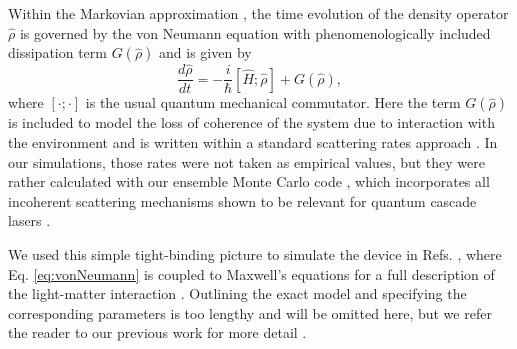 \documentclass[]{spie}  %
\def\h{\hat}
\def\h{\hat}
\begin{document}
Within the Markovian approximation \cite{knezevic2013time}, the time evolution of the density operator $\h{\rho}$ is governed by the von Neumann equation with phenomenologically included dissipation term $G(\h{\rho})$ and is given by
\begin{equation}
\label{eq:vonNeumann}
\frac{d \h\rho}{dt} = -\frac{i}{\hbar}[\h H;\h\rho] + G(\h{\rho}),
\end{equation}
where $[\cdot;\cdot]$ is the usual quantum mechanical commutator. Here the term $G(\h{\rho})$ is included to model the loss of coherence of the system due to interaction with the environment and is written within a standard scattering rates approach \cite{iotti2005microscopic}. In our simulations, those rates were not taken as empirical values, but they were rather calculated with our ensemble Monte Carlo code \cite{jirauschek2014modeling}, which incorporates all incoherent scattering mechanisms shown to be relevant for quantum cascade lasers \cite{jirauschek2009monte,jirauschek2010monte,jirauschek2010monte_2}. 

We used this simple tight-binding picture to simulate the device in Refs. , where Eq. \ref{eq:vonNeumann} is coupled to Maxwell's equations for a full description of the light-matter interaction \cite{gordon2008multimode,gkortsas2010dynamics,vukovic2016multimode}. Outlining the exact model and specifying the corresponding parameters is too lengthy and will be omitted here, but we refer the reader to our previous work for more detail \cite{petz2016}.
\end{document}
